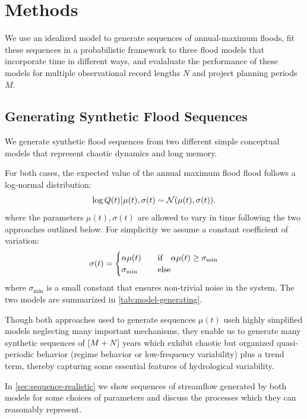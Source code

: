 \documentclass[11pt]{article}
\begin{document}
\section{Methods}\label{sec:methods}

We use an idealized model to generate sequences of annual-maximum floods, fit these sequences in a probabilistic framework to three flood models that incorporate time in different ways, and evalaluate the performance of these models for multiple observational record lengths \(N\) and project planning periods \(M\).

\subsection{Generating Synthetic Flood Sequences\label{sec:methods-generating}}

We generate synthetic flood sequences from two different simple conceptual models that represent chaotic dynamics and long memory.

For both cases, the expected value of the annual maximum flood flood follows a log-normal distribution:
\begin{equation} \label{eq:lognormal}
  \log Q(t) \big| \mu(t),\sigma(t) \sim \mathcal{N} \qty(\mu(t), \sigma(t)).
\end{equation}
where the parameters \( \mu(t), \sigma(t) \) are allowed to vary in time following the two approaches outlined below.
For simplicitiy we assume a constant coefficient of variation:
\begin{equation}
  \sigma(t) = \begin{cases} \alpha \mu(t) & \qqtext{if} \alpha \mu(t) \geq \sigma_\text{min} \\ \sigma_\text{min} & \qqtext{else} \end{cases}
\end{equation}
where \(\sigma_\text{min}\) is a small constant that ensures non-trivial noise in the system.
The two models are summarized in \cref{tab:model-generating}.

Though both approaches used to generate sequences \( \mu(t) \) useh highly simplified models neglecting many important mechanisms, they enable us to generate many synthetic sequences of \(\qty[M + N]\) years which exhibit chaotic but organized quasi-periodic behavior (regime behavior or low-frequency variability) plus a trend term, thereby capturing some essential features of hydrological variability.

In \cref{sec:sequence-realistic} we show sequences of streamflow generated by both models for some choices of parameters and discuss the processes which they can reasonably represent.
\end{document}
